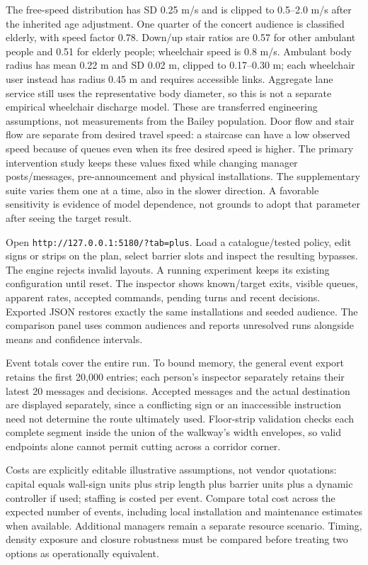 \documentclass[11pt,a4paper]{article}
\newcommand{\code}[1]{{\small\nolinkurl{#1}}}
\begin{document}
The free-speed distribution has SD 0.25 m/s and is clipped to 0.5–2.0 m/s after the inherited age adjustment. One quarter of the concert audience is classified elderly, with speed factor 0.78. Down/up stair ratios are 0.57 for other ambulant people and 0.51 for elderly people; wheelchair speed is 0.8 m/s. Ambulant body radius has mean 0.22 m and SD 0.02 m, clipped to 0.17–0.30 m; each wheelchair user instead has radius 0.45 m and requires accessible links. Aggregate lane service still uses the representative body diameter, so this is not a separate empirical wheelchair discharge model. These are transferred engineering assumptions, not measurements from the Bailey population. Door flow and stair flow are separate from desired travel speed: a staircase can have a low observed speed because of queues even when its free desired speed is higher. The primary intervention study keeps these values fixed while changing manager posts/messages, pre-announcement and physical installations. The supplementary suite varies them one at a time, also in the slower direction. A favorable sensitivity is evidence of model dependence, not grounds to adopt that parameter after seeing the target result.


Open \code{http://127.0.0.1:5180/?tab=plus}. Load a catalogue/tested policy, edit signs or strips on the plan, select barrier slots and inspect the resulting bypasses. The engine rejects invalid layouts. A running experiment keeps its existing configuration until reset. The inspector shows known/target exits, visible queues, apparent rates, accepted commands, pending turns and recent decisions. Exported JSON restores exactly the same installations and seeded audience. The comparison panel uses common audiences and reports unresolved runs alongside means and confidence intervals.


Event totals cover the entire run. To bound memory, the general event export retains the first 20,000 entries; each person's inspector separately retains their latest 20 messages and decisions. Accepted messages and the actual destination are displayed separately, since a conflicting sign or an inaccessible instruction need not determine the route ultimately used. Floor-strip validation checks each complete segment inside the union of the walkway's width envelopes, so valid endpoints alone cannot permit cutting across a corridor corner.


Costs are explicitly editable illustrative assumptions, not vendor quotations: capital equals wall-sign units plus strip length plus barrier units plus a dynamic controller if used; staffing is costed per event. Compare total cost across the expected number of events, including local installation and maintenance estimates when available. Additional managers remain a separate resource scenario. Timing, density exposure and closure robustness must be compared before treating two options as operationally equivalent.
\end{document}
